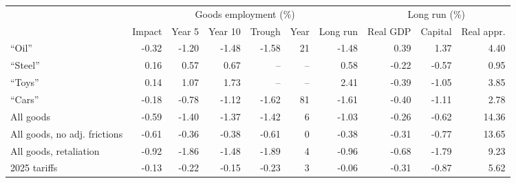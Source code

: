 \begin{tabular}{lrrrrrrrrr}
\toprule
 & \multicolumn{6}{c}{Goods employment (\%)} & \multicolumn{3}{c}{Long run (\%)} \\
\cmidrule(lr){2-7}\cmidrule(lr){8-10}
 & Impact & Year 5 & Year 10 & Trough & Year & Long run & Real GDP & Capital & Real appr. \\
\midrule
``Oil'' & -0.32 & -1.20 & -1.48 & -1.58 & 21 & -1.48 & 0.39 & 1.37 & 4.40 \\
``Steel'' & 0.16 & 0.57 & 0.67 & -- & -- & 0.58 & -0.22 & -0.57 & 0.95 \\
``Toys'' & 0.14 & 1.07 & 1.73 & -- & -- & 2.41 & -0.39 & -1.05 & 3.85 \\
``Cars'' & -0.18 & -0.78 & -1.12 & -1.62 & 81 & -1.61 & -0.40 & -1.11 & 2.78 \\
\midrule
All goods & -0.59 & -1.40 & -1.37 & -1.42 & 6 & -1.03 & -0.26 & -0.62 & 14.36 \\
All goods, no adj. frictions & -0.61 & -0.36 & -0.38 & -0.61 & 0 & -0.38 & -0.31 & -0.77 & 13.65 \\
All goods, retaliation & -0.92 & -1.86 & -1.48 & -1.89 & 4 & -0.96 & -0.68 & -1.79 & 9.23 \\
\midrule
2025 tariffs & -0.13 & -0.22 & -0.15 & -0.23 & 3 & -0.06 & -0.31 & -0.87 & 5.62 \\
\bottomrule
\end{tabular}
